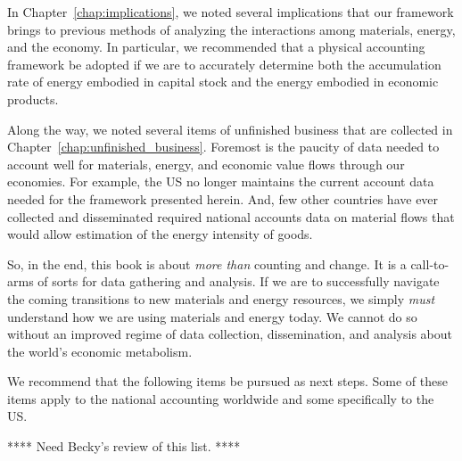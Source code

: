 In Chapter~\ref{chap:implications}, we noted several implications
that our framework brings to previous methods of analyzing 
the interactions among materials, energy, and the economy.
In particular, we recommended that a physical accounting framework
be adopted if we are to accurately determine
both the accumulation rate of energy embodied
in capital stock
and the energy embodied in economic products.

Along the way, we noted several items of unfinished business
that are collected in Chapter~\ref{chap:unfinished_business}.
Foremost is the paucity of data
needed to account well for materials, energy, and economic
value flows through our economies.
For example, the US no longer maintains the current account data
needed for the framework presented herein.
And, few other countries have ever collected and disseminated
required national accounts data on material flows that would allow
estimation of the energy intensity of goods.

\vspace{10 mm}

So, in the end, this book is about \emph{more than} counting and change.
It is a call-to-arms of sorts for data gathering and analysis.
If we are to successfully navigate the coming transitions
to new materials and energy resources, we simply \emph{must}
understand how we are using 
materials and energy today.
We cannot do so without an improved regime 
of data collection, dissemination, and analysis
about the world's economic metabolism.

We recommend that the following items be pursued as next steps.
Some of these items apply to the national accounting worldwide
and some specifically to the US.

**** Need Becky's review of this list. ****

